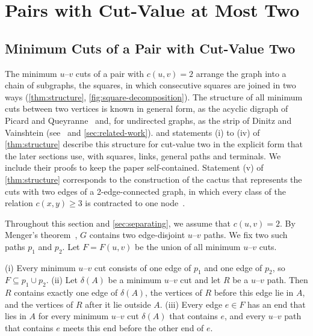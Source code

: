 \section{Pairs with Cut-Value at Most Two}
\label{sec:squares}

\subsection{Minimum Cuts of a Pair with Cut-Value Two}
\label{sec:structure}

The minimum $u$--$v$ cuts of a pair with $c(u, v) = 2$ arrange the graph into a chain of subgraphs, the squares, in which consecutive squares are joined in two ways (\cref{thm:structure}, \cref{fig:square-decomposition}).
The structure of all minimum cuts between two vertices is known in general form, as the acyclic digraph of Picard and Queyranne~\cite{PicardQueyranne1980} and, for undirected graphs, as the strip of Dinitz and Vainshtein (see~\cite{BaswanaPandey2025Carcass} and \cref{sec:related-work}).
 and statements (i) to (iv) of \cref{thm:structure} describe this structure for cut-value two in the explicit form that the later sections use, with squares, links, general paths and terminals.
We include their proofs to keep the paper self-contained.
Statement (v) of \cref{thm:structure} corresponds to the construction of the cactus that represents the cuts with two edges of a 2-edge-connected graph, in which every class of the relation $c(x, y) \geq 3$ is contracted to one node~\cite{Mehlhorn2017Certifying}.

Throughout this section and \cref{sec:separating}, we assume that $c(u, v) = 2$.
By Menger's theorem~\cite[Corollary~3.3.5]{Diestel2025}, $G$ contains two edge-disjoint $u$--$v$ paths.
We fix two such paths $p_1$ and $p_2$.
Let $F = F(u, v)$ be the union of all minimum $u$--$v$ cuts.

\begin{lemma}
\label{lem:orientation}
(i) Every minimum $u$--$v$ cut consists of one edge of $p_1$ and one edge of $p_2$, so $F \subseteq p_1 \cup p_2$.
(ii) Let $\delta(A)$ be a minimum $u$--$v$ cut and let $R$ be a $u$--$v$ path.
Then $R$ contains exactly one edge of $\delta(A)$, the vertices of $R$ before this edge lie in $A$, and the vertices of $R$ after it lie outside $A$.
(iii) Every edge $e \in F$ has an end that lies in $A$ for every minimum $u$--$v$ cut $\delta(A)$ that contains $e$, and every $u$--$v$ path that contains $e$ meets this end before the other end of $e$.
\end{lemma}

